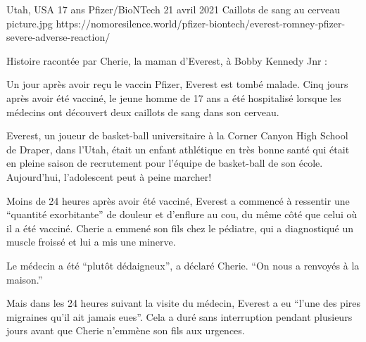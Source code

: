 {Utah, USA}
{17 ans}
{Pfizer/BioNTech}
{21 avril 2021}
{Caillots de sang au cerveau}
{picture.jpg}
{https://nomoresilence.world/pfizer-biontech/everest-romney-pfizer-severe-adverse-reaction/}
{

Histoire racontée par Cherie, la maman d'Everest, à Bobby Kennedy Jnr :

Un jour après avoir reçu le vaccin Pfizer, Everest est tombé malade. Cinq jours
après avoir été vacciné, le jeune homme de 17 ans a été hospitalisé lorsque les
médecins ont découvert deux caillots de sang dans son cerveau.

Everest, un joueur de basket-ball universitaire à la Corner Canyon High School
de Draper, dans l'Utah, était un enfant athlétique en très bonne santé qui était
en pleine saison de recrutement pour l'équipe de basket-ball de son
école. Aujourd'hui, l'adolescent peut à peine marcher!

Moins de 24 heures après avoir été vacciné, Everest a commencé à ressentir une
“quantité exorbitante” de douleur et d'enflure au cou, du même côté que celui où
il a été vacciné. Cherie a emmené son fils chez le pédiatre, qui a diagnostiqué
un muscle froissé et lui a mis une minerve.

Le médecin a été “plutôt dédaigneux”, a déclaré Cherie. “On nous a renvoyés à la
maison.”

Mais dans les 24 heures suivant la visite du médecin, Everest a eu “l'une des
pires migraines qu'il ait jamais eues”. Cela a duré sans interruption pendant
plusieurs jours avant que Cherie n'emmène son fils aux urgences.

}
